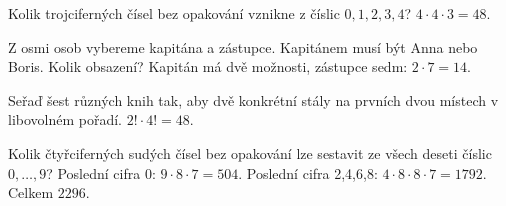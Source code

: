 \documentclass[11pt,a4paper]{article}
\begin{document}
\begin{zadaniReseniBox}[title={Samostatná práce 1}]
Kolik trojciferných čísel bez opakování vznikne z číslic $0,1,2,3,4$?
\tcblower
$4\cdot4\cdot3=48$.
\end{zadaniReseniBox}



\begin{zadaniReseniBox}[title={Samostatná práce 2}]
Z osmi osob vybereme kapitána a zástupce. Kapitánem musí být Anna nebo Boris. Kolik obsazení?
\tcblower
Kapitán má dvě možnosti, zástupce sedm: $2\cdot7=14$.
\end{zadaniReseniBox}



\begin{zadaniReseniBox}[title={Samostatná práce 3}]
Seřaď šest různých knih tak, aby dvě konkrétní stály na prvních dvou místech v libovolném pořadí.
\tcblower
$2!\cdot4!=48$.
\end{zadaniReseniBox}




\begin{zadaniReseniBox}[title={Rozšíření 1}]
Kolik čtyřciferných sudých čísel bez opakování lze sestavit ze všech deseti číslic $0,\ldots,9$?
\tcblower
Poslední cifra 0: $9\cdot8\cdot7=504$. Poslední cifra 2,4,6,8: $4\cdot8\cdot8\cdot7=1792$. Celkem $2296$.
\end{zadaniReseniBox}




\end{document}
